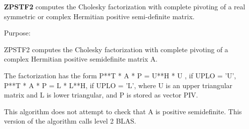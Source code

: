 {\bfseries Z\+P\+S\+T\+F2} computes the Cholesky factorization with complete pivoting of a real symmetric or complex Hermitian positive semi-\/definite matrix. 

 \begin{DoxyParagraph}{Purpose\+: }
\begin{DoxyVerb} ZPSTF2 computes the Cholesky factorization with complete
 pivoting of a complex Hermitian positive semidefinite matrix A.

 The factorization has the form
    P**T * A * P = U**H * U ,  if UPLO = 'U',
    P**T * A * P = L  * L**H,  if UPLO = 'L',
 where U is an upper triangular matrix and L is lower triangular, and
 P is stored as vector PIV.

 This algorithm does not attempt to check that A is positive
 semidefinite. This version of the algorithm calls level 2 BLAS.\end{DoxyVerb}
 
\end{DoxyParagraph}


